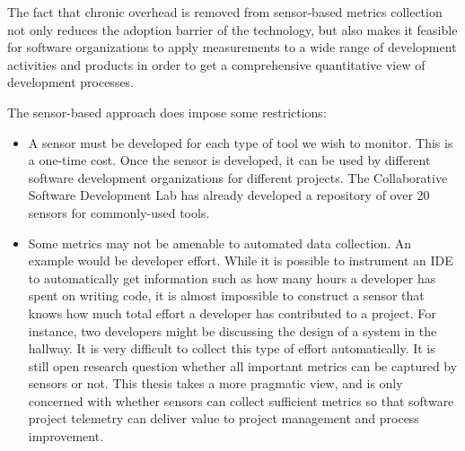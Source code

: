 The fact that chronic overhead is removed from sensor-based metrics collection not only reduces the adoption barrier of the technology, but also makes it feasible for software organizations to apply measurements to a wide range of development activities and products in order to get a comprehensive quantitative view of development processes.



The sensor-based approach does impose some restrictions:

\begin{itemize}
	
	\item A sensor must be developed for each type of tool we wish to monitor. This is a one-time cost. Once the sensor is developed, it can be used by different software development organizations for different projects. The Collaborative Software Development Lab has already developed a repository of over 20 sensors for commonly-used tools.

  \item Some metrics may not be amenable to automated data collection. An example would be developer effort. While it is possible to instrument an IDE to automatically get information such as how many hours a developer has spent on writing code, it is almost impossible to construct a sensor that knows how much total effort a developer has contributed to a project. For instance, two developers might be discussing the design of a system in the hallway. It is very difficult to collect this type of effort automatically. It is still open research question whether all important metrics can be captured by sensors or not. This thesis takes a more pragmatic view, and is only concerned with whether sensors can collect sufficient metrics so that software project telemetry can deliver value to project management and process improvement. 
  
 
\end{itemize}







